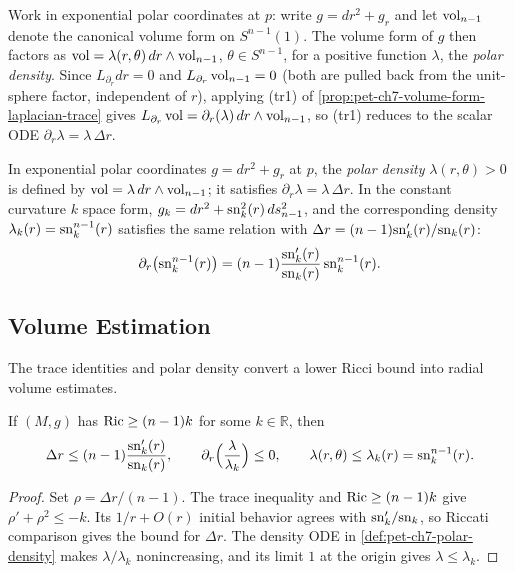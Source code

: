 Work in exponential polar coordinates at $p$: write $g=dr^2+g_r$ and let
$\operatorname{vol}_{n-1}$ denote the canonical volume form on $S^{n-1}(1)$. The volume form
of $g$ then factors as $\operatorname{vol}=\lambda(r,\theta)\,dr\wedge\operatorname{vol}_{n-1}$,
$\theta\in S^{n-1}$, for a positive function $\lambda$, the \emph{polar
density}. Since $L_{\partial_r}dr=0$ and $L_{\partial_r}\operatorname{vol}_{n-1}=0$ (both
are pulled back from the unit-sphere factor, independent of $r$), applying
(tr1) of \cref{prop:pet-ch7-volume-form-laplacian-trace} gives
$L_{\partial_r}\operatorname{vol}=\partial_r(\lambda)\,dr
\wedge\operatorname{vol}_{n-1}$, so (tr1) reduces to the scalar ODE
$\partial_r\lambda=\lambda\,\Delta r$.

\begin{definition}
  \label{def:pet-ch7-polar-density}

  In exponential polar coordinates $g=dr^2+g_r$ at $p$, the \emph{polar
  density} $\lambda(r,\theta)>0$ is defined by
  $\operatorname{vol}=\lambda\,dr\wedge\operatorname{vol}_{n-1}$; it satisfies
  $\partial_r\lambda=\lambda\,\Delta r$. In the constant curvature $k$ space
  form, $g_k=dr^2+\mathrm{sn}_k^2(r)\,ds_{n-1}^2$, and the corresponding density
  $\lambda_k(r)=\mathrm{sn}_k^{n-1}(r)$ satisfies the same relation with
  $\Delta r=(n-1)\mathrm{sn}_k'(r)/\mathrm{sn}_k(r)$:
  \[
    \partial_r\big(\mathrm{sn}_k^{n-1}(r)\big)
    =(n-1)\frac{\mathrm{sn}_k'(r)}{\mathrm{sn}_k(r)}\,\mathrm{sn}_k^{n-1}(r).
  \]
\end{definition}

\subsection{Volume Estimation}

The trace identities and polar density convert a lower Ricci bound into
radial volume estimates.

\begin{lemma}
  \label{lem:pet-ch7-ricci-comparison-mean-curvature}

  If $(M,g)$ has $\operatorname{Ric}\ge(n-1)k$ for some $k\in\mathbb{R}$, then
  \[
    \Delta r\le(n-1)\frac{\mathrm{sn}_k'(r)}{\mathrm{sn}_k(r)},
    \qquad
    \partial_r\Big(\frac{\lambda}{\lambda_k}\Big)\le0,
    \qquad
    \lambda(r,\theta)\le\lambda_k(r)=\mathrm{sn}_k^{n-1}(r).
  \]
\end{lemma}
\begin{proof}
  \sketch
  Set \(\rho=\Delta r/(n-1)\). The trace inequality and \(\operatorname{Ric}\ge(n-1)k\) give \(\rho'+\rho^2\le-k\). Its \(1/r+O(r)\) initial behavior agrees with \(\mathrm{sn}_k'/\mathrm{sn}_k\), so Riccati comparison gives the bound for \(\Delta r\). The density ODE in \cref{def:pet-ch7-polar-density} makes \(\lambda/\lambda_k\) nonincreasing, and its limit \(1\) at the origin gives \(\lambda\le\lambda_k\).
\end{proof}

